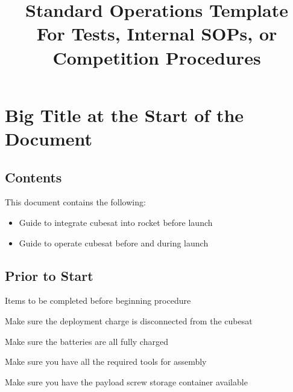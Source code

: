 

\title{
\Huge Standard Operations Template\\
\vspace{1cm}
\Large For Tests, Internal SOPs, or Competition Procedures}








\section{Big Title at the Start of the Document}


\subsection{Contents}
This document contains the following:
\begin{itemize}
    \item Guide to integrate cubesat into rocket before launch
    \item Guide to operate cubesat before and during launch
\end{itemize}

\subsection{Prior to Start}
\begin{checklist}
    \item Items to be completed before beginning procedure
    \begin{checklist}
        \item Make sure the deployment charge is disconnected from the cubesat
	\item Make sure the batteries are all fully charged
	\item Make sure you have all the required tools for assembly
	\item Make sure you have the payload screw storage container available
    \end{checklist}
\end{checklist}
\setcounter{checklistnum}{0}

